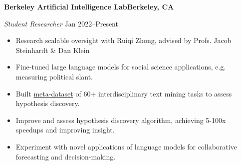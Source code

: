 \textbf{Berkeley Artificial Intelligence Lab\hfill Berkeley, CA}\par
\textit{Student Researcher} \hfill Jan 2022--Present\par
\begin{itemize}
	\item Research scalable oversight with Ruiqi Zhong, advised by Profs. Jacob Steinhardt \& Dan Klein
	\item Fine-tuned large language models for social science applications, e.g. measuring political slant.
	\item Built \href{https://github.com/petezh/Describe-Differences-Benchmark}{meta-dataset} of 60+ interdisciplinary text mining tasks to assess hypothesis discovery.
	\item Improve and assess hypothesis discovery algorithm, achieving 5-100x speedups and improving insight.
	\item Experiment with novel applications of language models for collaborative forecasting and decision-making.
\end{itemize} \par